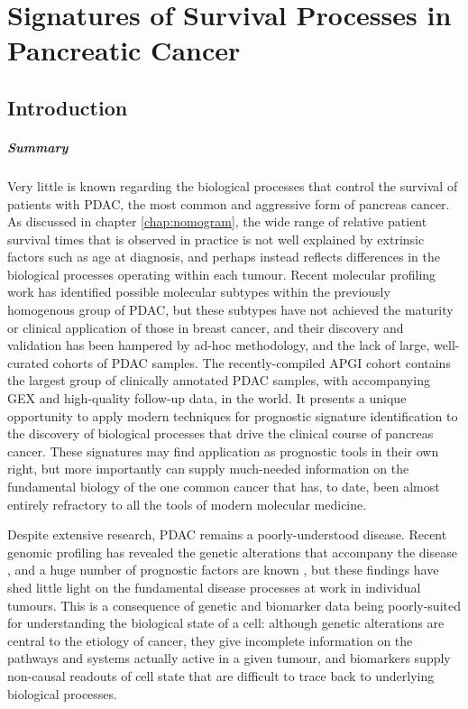 \documentclass[dissertation.tex]{subfiles}
\begin{document}
\chapter{Signatures of Survival Processes in Pancreatic Cancer}
\label{chap:signatures}


\section{Introduction}

\paragraph{Summary}Very little is known regarding the biological processes that control the survival of patients with \gls{PDAC}, the most common and aggressive form of pancreas cancer.  As discussed in chapter \ref{chap:nomogram}, the wide range of relative patient survival times that is observed in practice is not well explained by extrinsic factors such as age at diagnosis, and perhaps instead reflects differences in the biological processes operating within each tumour.  Recent molecular profiling work has identified possible molecular subtypes within the previously homogenous group of \gls{PDAC}, but these subtypes have not achieved the maturity or clinical application of those in breast cancer, and their discovery and validation has been hampered by ad-hoc methodology, and the lack of large, well-curated cohorts of \gls{PDAC} samples.  The recently-compiled \gls{APGI} cohort contains the largest group of clinically annotated \gls{PDAC} samples, with accompanying \gls{GEX} and high-quality follow-up data, in the world.  It presents a unique opportunity to apply modern techniques for prognostic signature identification to the discovery of biological processes that drive the clinical course of pancreas cancer.  These signatures may find application as prognostic tools in their own right, but more importantly can supply much-needed information on the fundamental biology of the one common cancer that has, to date, been almost entirely refractory to all the tools of modern molecular medicine.

\vspace{1cm}

Despite extensive research, \gls{PDAC} remains a poorly-understood disease.  Recent genomic profiling has revealed the genetic alterations that accompany the disease \cite{Biankin2012}, and a huge number of prognostic factors are known \cite{Harsha2009}, but these findings have shed little light on the fundamental disease processes at work in individual tumours.  This is a consequence of genetic and biomarker data being poorly-suited for understanding the biological state of a cell: although genetic alterations are central to the etiology of cancer, they give incomplete information on the pathways and systems actually active in a given tumour, and biomarkers supply non-causal readouts of cell state that are difficult to trace back to underlying biological processes.
\end{document}
